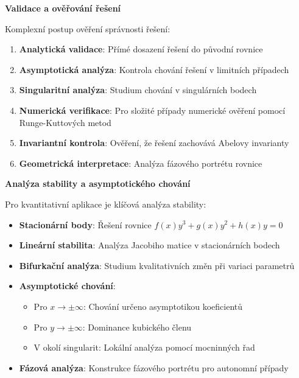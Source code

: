 \vspace{1\baselineskip}

\noindent\textbf{Validace a ověřování řešení}

Komplexní postup ověření správnosti řešení:

\begin{enumerate}
\item \textbf{Analytická validace}: Přímé dosazení řešení do původní rovnice

\item \textbf{Asymptotická analýza}: Kontrola chování řešení v limitních případech

\item \textbf{Singularitní analýza}: Studium chování v singulárních bodech

\item \textbf{Numerická verifikace}: Pro složité případy numerické ověření pomocí Runge-Kuttových metod

\item \textbf{Invariantní kontrola}: Ověření, že řešení zachovává Abelovy invarianty

\item \textbf{Geometrická interpretace}: Analýza fázového portrétu rovnice
\end{enumerate}

\vspace{1\baselineskip}

\noindent\textbf{Analýza stability a asymptotického chování}

Pro kvantitativní aplikace je klíčová analýza stability:

\begin{itemize}
\item \textbf{Stacionární body}: Řešení rovnice $f(x)y^3 + g(x)y^2 + h(x)y = 0$
\item \textbf{Lineární stabilita}: Analýza Jacobiho matice v stacionárních bodech
\item \textbf{Bifurkační analýza}: Studium kvalitativních změn při variaci parametrů
\item \textbf{Asymptotické chování}: 
\begin{itemize}
\item Pro $x \to \pm\infty$: Chování určeno asymptotikou koeficientů
\item Pro $y \to \pm\infty$: Dominance kubického členu
\item V okolí singularit: Lokální analýza pomocí mocninných řad
\end{itemize}
\item \textbf{Fázová analýza}: Konstrukce fázového portrétu pro autonomní případy
\end{itemize}

